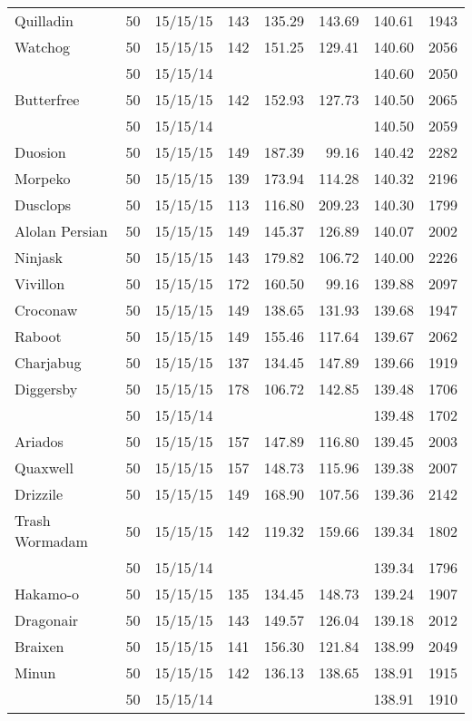 \begin{longtable}{lrrrrrrr}
Quilladin & 50 & 15/15/15 & 143 & 135.29 & 143.69 & 140.61 & 1943\\
Watchog & 50 & 15/15/15 & 142 & 151.25 & 129.41 & 140.60 & 2056\\
 & 50 & 15/15/14 & & & & 140.60 & 2050\\
Butterfree & 50 & 15/15/15 & 142 & 152.93 & 127.73 & 140.50 & 2065\\
 & 50 & 15/15/14 & & & & 140.50 & 2059\\
Duosion & 50 & 15/15/15 & 149 & 187.39 & 99.16 & 140.42 & 2282\\
Morpeko & 50 & 15/15/15 & 139 & 173.94 & 114.28 & 140.32 & 2196\\
Dusclops & 50 & 15/15/15 & 113 & 116.80 & 209.23 & 140.30 & 1799\\
Alolan Persian & 50 & 15/15/15 & 149 & 145.37 & 126.89 & 140.07 & 2002\\
Ninjask & 50 & 15/15/15 & 143 & 179.82 & 106.72 & 140.00 & 2226\\
Vivillon & 50 & 15/15/15 & 172 & 160.50 & 99.16 & 139.88 & 2097\\
Croconaw & 50 & 15/15/15 & 149 & 138.65 & 131.93 & 139.68 & 1947\\
Raboot & 50 & 15/15/15 & 149 & 155.46 & 117.64 & 139.67 & 2062\\
Charjabug & 50 & 15/15/15 & 137 & 134.45 & 147.89 & 139.66 & 1919\\
Diggersby & 50 & 15/15/15 & 178 & 106.72 & 142.85 & 139.48 & 1706\\
 & 50 & 15/15/14 & & & & 139.48 & 1702\\
Ariados & 50 & 15/15/15 & 157 & 147.89 & 116.80 & 139.45 & 2003\\
Quaxwell & 50 & 15/15/15 & 157 & 148.73 & 115.96 & 139.38 & 2007\\
Drizzile & 50 & 15/15/15 & 149 & 168.90 & 107.56 & 139.36 & 2142\\
Trash Wormadam & 50 & 15/15/15 & 142 & 119.32 & 159.66 & 139.34 & 1802\\
 & 50 & 15/15/14 & & & & 139.34 & 1796\\
Hakamo-o & 50 & 15/15/15 & 135 & 134.45 & 148.73 & 139.24 & 1907\\
Dragonair & 50 & 15/15/15 & 143 & 149.57 & 126.04 & 139.18 & 2012\\
Braixen & 50 & 15/15/15 & 141 & 156.30 & 121.84 & 138.99 & 2049\\
Minun & 50 & 15/15/15 & 142 & 136.13 & 138.65 & 138.91 & 1915\\
 & 50 & 15/15/14 & & & & 138.91 & 1910\\

\end{longtable}
